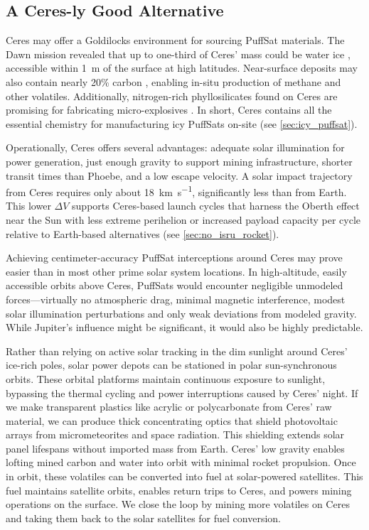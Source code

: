 \documentclass{article}
\begin{document}
\subsection{A Ceres-ly Good Alternative}
Ceres may offer a Goldilocks environment for sourcing PuffSat materials. The Dawn mission revealed that up to one-third of Ceres' mass could be water ice \cite{ceres_ice}, accessible within \SI{1}{\meter} of the surface at high latitudes. Near-surface deposits may also contain nearly 20\% carbon \cite{ceres_carbon_nitrogen}, enabling in-situ production of methane and other volatiles. Additionally, nitrogen-rich phyllosilicates found on Ceres are promising for fabricating micro-explosives \cite{ceres_carbon_nitrogen}. In short, Ceres contains all the essential chemistry for manufacturing icy PuffSats on-site (see \autoref{sec:icy_puffsat}).

Operationally, Ceres offers several advantages: adequate solar illumination for power generation, just enough gravity to support mining infrastructure, shorter transit times than Phoebe, and a low escape velocity. A solar impact trajectory from Ceres requires only about \SI{18}{\kilo\meter\per\second}, significantly less than from Earth. This lower $\Delta V$ supports Ceres-based launch cycles that harness the Oberth effect near the Sun with less extreme perihelion or increased payload capacity per cycle relative to Earth-based alternatives (see \autoref{sec:no_isru_rocket}).

Achieving centimeter-accuracy PuffSat interceptions around Ceres may prove easier than in most other prime solar system locations. In high-altitude, easily accessible orbits above Ceres, PuffSats would encounter negligible unmodeled forces—virtually no atmospheric drag, minimal magnetic interference, modest solar illumination perturbations and only weak deviations from modeled gravity. While Jupiter's influence might be significant, it would also be highly predictable. 

Rather than relying on active solar tracking in the dim sunlight around Ceres' ice-rich poles, solar power depots can be stationed in polar sun-synchronous orbits. These orbital platforms maintain continuous exposure to sunlight, bypassing the thermal cycling and power interruptions caused by Ceres’ night. If we make transparent plastics like acrylic or polycarbonate from Ceres' raw material, we can produce thick concentrating optics that shield photovoltaic arrays from micrometeorites and space radiation.  This shielding extends solar panel lifespans without imported mass from Earth. Ceres’ low gravity enables lofting mined carbon and water into orbit with minimal rocket propulsion. Once in orbit, these volatiles can be converted into fuel at solar-powered satellites.  This fuel maintains satellite orbits, enables return trips to Ceres, and powers mining operations on the surface.   We close the loop by mining more volatiles on Ceres and taking them back to the solar satellites for fuel conversion. 
\end{document}
